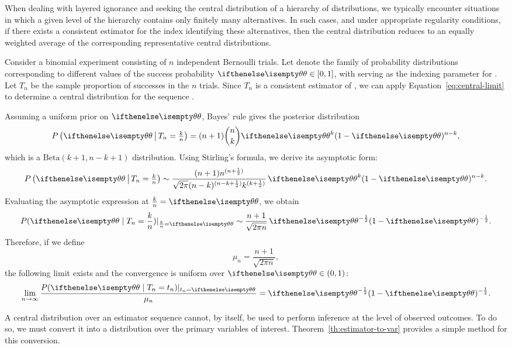 When dealing with layered ignorance and seeking the central distribution of a hierarchy of distributions,
we typically encounter situations in which a given level of the hierarchy contains only finitely many alternatives.
In such cases, and under appropriate regularity conditions, if there exists a consistent estimator for the index
identifying these alternatives, then the central distribution reduces to an equally weighted average of the
corresponding representative central distributions.

\begin{example}
    \newcommand{\pv}{\paramVal}
    Consider a binomial experiment consisting of $n$ independent Bernoulli trials.
    Let \setQ denote the family of probability distributions corresponding to different values of the success
    probability $\pv \in [0,1]$, with \pv serving as the indexing parameter for \setQ.
    Let $T_n$ be the sample proportion of successes in the $n$ trials.
    Since $T_n$ is a consistent estimator of \pv, we can apply Equation~\ref{eq:central-limit} to determine a
    central distribution for the
    sequence .

    Assuming a uniform prior on $\pv$, Bayes’ rule gives the posterior distribution
    \[
        P\left( \pv \, \middle| \, T_n = \tfrac{k}{n} \right) = (n+1)\binom{n}{k} \pv^k (1 - \pv)^{n - k},
    \]
    which is a $\mathrm{Beta}(k+1, n-k+1)$ distribution.
    Using Stirling’s formula, we derive its asymptotic form:
    \begin{equation*}
        P\left( \pv \, \middle| \, T_n = \tfrac{k}{n} \right) \sim
        \frac{(n+1)n^{(n+\hf)}}{\sqrt{2 \pi} (n-k)^{(n-k+\hf)} k^{(k+\hf)}} \, \pv^k (1 - \pv)^{n - k}.
    \end{equation*}
    Evaluating the asymptotic expression at $\frac{k}{n} = \pv$, we obtain
    \begin{equation*}
        P(\paramVal \mid\est_n = \frac{k}{n})|_{\frac{k}{n} = \paramVal} \sim \frac{n+1}{\sqrt{2 \pi n}} \, \pv^{-\hf}(1 - \pv)^{
            -\hf}.
    \end{equation*}
    Therefore, if we define
    \[
        \mu_n = \frac{n+1}{\sqrt{2 \pi n}},
    \]
    the following limit exists and the convergence is uniform over $\paramVal \in (0,1)$:
    \[
        \toInf \frac{P(\paramVal \mid\est_n = t_n)|_{t_n = \paramVal}}{\mu_n} = \pv^{-\hf}(1 - \pv)^{-\hf}.
    \]
\end{example}

A central distribution over an estimator sequence cannot, by itself, be used to perform inference at the level of
observed outcomes.
To do so, we must convert it into a distribution over the primary variables of interest.
Theorem~\ref{th:estimator-to-var} provides a simple
method for this conversion.

